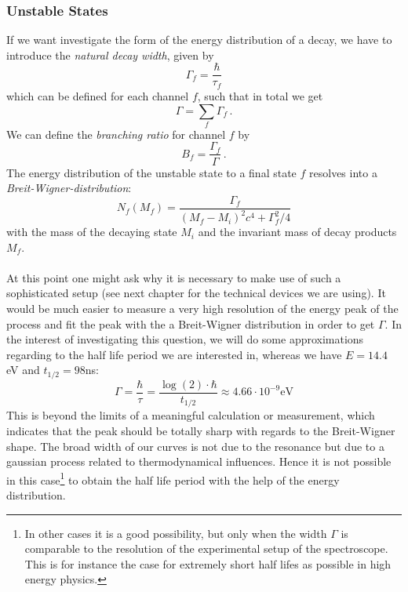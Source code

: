 \subsubsection{Unstable States}
\label{ssub:Unstable States}
If we want investigate the form of the energy distribution of a decay, we have to 
introduce the \emph{natural decay width}, given by
\begin{equation}
    \Gamma_f = \frac{\hbar}{\tau_f} 
\end{equation}
which can be defined for each channel $f$, such that in total we get
\begin{equation}
    \Gamma = \sum_{f} \Gamma_f \, .
\end{equation}
We can define the \emph{branching ratio} for channel $f$ by
\begin{equation}
    B_f = \frac{\Gamma_f}{\Gamma} \, .
\end{equation}
The energy distribution of the unstable state to a final state $f$ resolves into a 
\emph{Breit-Wigner-distribution}: 
\begin{equation}
    N_f(M_f) = \frac{\Gamma_f}{(M_f-M_i)^2 c^4 + \Gamma_f^2/4}
\end{equation}
with the mass of the decaying state $M_i$ and the invariant mass of decay products $M_f$. \\\\
At this point one might ask why it is necessary to make use of such a sophisticated setup (see next chapter
for the technical devices we are using). It would be much easier to measure a very high resolution of the
energy peak of the process and fit the peak with the a Breit-Wigner distribution in order to get $\Gamma$. 
In the interest of investigating this question, we will do some approximations regarding to the
half life period we are interested in, whereas we have $E = 14.4$ eV and $t_{1/2} = 98$ns:
\begin{equation}
    \Gamma = \frac{\hbar}{\tau} = \frac{\log(2)\cdot \hbar}{t_{1/2}} \approx 4.66 \cdot 10^{-9} \mathrm{eV} 
\end{equation}
This is beyond the limits of a meaningful calculation or measurement, which indicates that the peak should
be totally sharp with regards to the Breit-Wigner shape. The broad width of our curves is not due to the
resonance but due to a gaussian process related to thermodynamical influences. Hence it is not possible
in this case\footnote{In other cases it is a good possibility, but only when the width $\Gamma$ is comparable
to the resolution of the experimental setup of the spectroscope. This is for instance the case for extremely
short half lifes as possible in high energy physics.}
to obtain the half life period with the help of the energy distribution.
\clearpage

